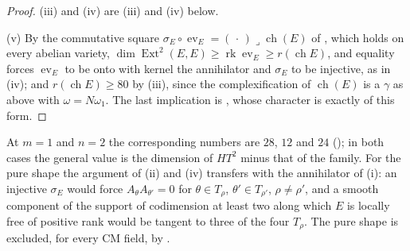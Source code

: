 \documentclass[11pt,reqno]{amsart}
\theoremstyle{plain}
\theoremstyle{definition}
\theoremstyle{remark}
\DeclareMathOperator{\ch}{ch}
\DeclareMathOperator{\Ext}{Ext}
\begin{document}
\begin{proof}
(iii) and (iv) are (iii) and (iv) below.

(v) By the commutative square $\sigma_{E}\circ\operatorname{ev}_{E}=(\,\cdot\,)
\lrcorner\ch(E)$ of , which holds on every abelian
variety, $\dim\Ext^{2}(E,E)\ge\operatorname{rk}\operatorname{ev}_{E}\ge
r(\ch E)$, and equality forces $\operatorname{ev}_{E}$ to be onto with kernel
the annihilator and $\sigma_{E}$ to be injective, as in
(iv); and $r(\ch E)\ge80$ by (iii), since the
complexification of $\ch(E)$ is a $\gamma$ as above with $\omega=N\omega_{1}$.
The last implication is \cite[Theorem~17.7(v)]{paperI}, whose character is
exactly of this form.
\end{proof}

At $m=1$ and $n=2$ the corresponding numbers are $28$, $12$ and $24$
(); in both cases the general value is the dimension
of $HT^{2}$ minus that of the family. For the pure shape the argument of
(ii) and (iv) transfers with the annihilator of
(i): an injective $\sigma_{E}$ would force
$A_{\theta}A_{\theta'}=0$ for $\theta\in T_{\rho}$, $\theta'\in T_{\rho'}$,
$\rho\ne\rho'$, and a smooth component of the support of codimension at least
two along which $E$ is locally free of positive rank would be tangent to three
of the four $T_{\rho}$. The pure shape is excluded, for every CM
field, by .
\end{document}
